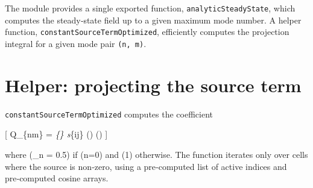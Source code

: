 \documentclass[
  letterpaper,
  DIV=11,
  numbers=noendperiod]{scrreprt}
\begin{document}
The module provides a single exported function,
\texttt{analyticSteadyState}, which computes the steady‑state field up
to a given maximum mode number. A helper function,
\texttt{constantSourceTermOptimized}, efficiently computes the
projection integral for a given mode pair \texttt{(n,\ m)}.

\section{Helper: projecting the source
term}\label{helper-projecting-the-source-term}

\texttt{constantSourceTermOptimized} computes the coefficient

{[} Q\_\{nm\} = 
\sum\emph{\{\} s}\{ij\}
\cos\left(\right)
\cos\left(\right) {]}

where (\epsilon\_n = 0.5) if (n=0) and (1) otherwise. The function
iterates only over cells where the source is non‑zero, using a
pre‑computed list of active indices and pre‑computed cosine arrays.
\end{document}
